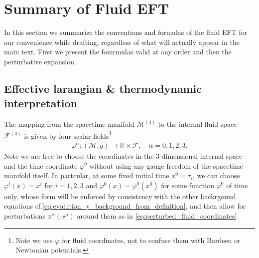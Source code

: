 \section{Summary of Fluid EFT}
%
In this section we summarize the conventions and formulas of the fluid EFT for our convenience while drafting, regardless of what will actually appear in the main text.
First we present the fomrmulas valid at any order and then the perturbative expansion.


\subsection{Effective larangian \& thermodynamic interpretation}\label{sec:fluid_eft_exact}
%
The mapping from the spacetime manifold $\mathcal{M}^{(4)}$ to the internal fluid space $\mathcal{F}^{(3)}$ is given by four scalar fields\footnote{Note we use $\varphi$ for fluid coordinates, not to confuse them with Bardeen or Newtonian potentials.}  
{\small\begin{align}\label{eq:internal_coord_fluid}
    \varphi^{\alpha}:(\mathcal{M},g)\to \mathbb{R}\times \mathcal{F},\quad \alpha=0,1,2,3.
\end{align}}
Note we are free to choose the coordinates in the 3-dimensional internal space and the time coordinate $\varphi^0$ without using any gauge freedom of the spacetime manifold itself.
In partcular, at some fixed initial time $x^0=\tau_{i}$, we can choose $\varphi^i(x)=x^i$ for $i=1,2,3$ and $\varphi^0(x)=\bar{\varphi}^0(x^0)$ for some function $\bar{\varphi}^0$ of time only, whose form will be enforced by consistency with the other backrgound equations cf.\eqref{eq:evolution_y_background_from_definition}, and then allow for perturbations $\pi^\alpha(x^\mu)$ around them as in \eqref{eq:perturbed_fluid_coordinates}.

